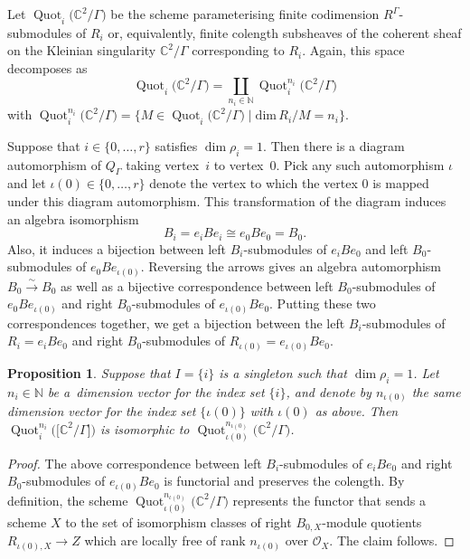 \documentclass[10pt,a4paper]{amsart}
\newtheorem{Proposition}[Theorem]{Proposition}
 { \theoremstyle{definition}
\newtheorem{Definition}[Theorem]{Definition}
\newtheorem{Example}[Theorem]{Example}
\newtheorem{Remark}[Theorem]{Remark}
\newtheorem{remarks}[theorem]{Remarks}
}
\newcommand{\SC}{\mathbb{C}} %
\newcommand{\PiGamma}{B}
\DeclareMathOperator{\Quot}{\mathrm{Quot}}
\newcommand{\Quoti}[1][ ]{\Quot_i^{#1}}
\newcommand{\Quotini}{\Quoti[n_i]}
\numberwithin{equation}{section}
\begin{document}
Let $\Quoti \big(\SC^2/\Gamma\big)$ be the scheme parameterising finite codimension $R^{\Gamma}$-submodules of $R_i$
or, equivalently, finite colength subsheaves of the coherent sheaf on the Kleinian singularity $\SC^2/\Gamma$ corresponding to $R_i$.
Again, this space decomposes as
\[ \Quoti \big(\SC^2/\Gamma\big)=\coprod_{n_i\in \mathbb{N}} \Quotini \big(\SC^2/\Gamma\big) \]
with $\Quotini \big(\SC^2/\Gamma\big) = \big\{M \in \Quoti \big(\SC^2/\Gamma\big) \mid
\mathrm{dim}\,R_i/M =n_i
\big\}$.

Suppose that $i\in\{0,\ldots, r\}$ satisfies $\dim \rho_i =1$. Then there is a diagram automorphism of $Q_\Gamma$ taking vertex~$i$ to vertex~$0$. Pick any such
automorphism $\iota$ and let
$\iota(0) \in \{0,\dots,r\}$ denote the vertex to which the
vertex $0$ is mapped under this diagram automorphism. This transformation of the diagram induces an algebra isomorphism \[B_i=e_i \PiGamma e_i\cong e_0 \PiGamma e_0=B_0.\]
Also, it induces a bijection between left $B_i$-submodules of $e_iBe_0$ and left $B_0$-submodules of $e_{0}Be_{\iota(0)}$. Reversing the arrows gives an algebra automorphism $B_0 \xrightarrow{\sim} B_0$ as well as a bijective correspondence between left $B_0$-submodules of $e_{0}Be_{\iota(0)}$ and right $B_0$-submodules of $e_{\iota(0)}Be_{0}$. Putting these two correspondences together, we get a bijection between the left $B_i$-submodules of $R_i=e_iBe_0$ and right $B_0$-submodules of $R_{\iota(0)}=e_{\iota(0)}Be_{0}$.

\begin{Proposition}\label{prop:Quotcommiso}
Suppose that $I=\{i\}$ is a singleton such
that $\dim \rho_i =1$. Let $n_i \in \mathbb{N}$
be a~dimension vector for the index set $\{i\}$, and denote
by $n_{\iota(0)}$ the same dimension vector for the
index set $\{\iota(0)\}$ with $\iota(0)$
as above. Then $\Quotini \big(\big[\SC^2/\Gamma\big]\big)$ is isomorphic
to $\Quot_{\iota(0)}^{n_{\iota(0)}}\big(\SC^2/\Gamma\big)$.
\end{Proposition}
\begin{proof}
The above correspondence between left $B_i$-sub\-modules of $e_iBe_0$
and right $B_0$-sub\-mo\-du\-les of $e_{\iota(0)}Be_{0}$ is functorial
and preserves the colength. By definition, the scheme
$\Quot_{\iota(0)}^{n_{\iota(0)}}\!\big(\SC^2/\Gamma\big)$ represents the functor
that sends a scheme $X$ to the set of isomorphism classes of
right $\PiGamma_{0,X}$-module quotients $R_{\iota(0),X} \to Z$ which are
locally free of rank $n_{\iota(0)}$ over $\mathcal{O}_X$. The claim follows.
\end{proof}
\end{document}
